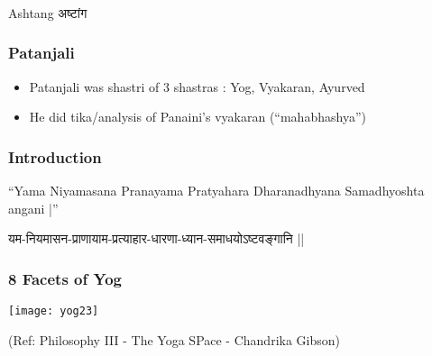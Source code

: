 \begin{frame}[fragile]\frametitle{}
\begin{center}
{\Large Ashtang अष्टांग }
\end{center}
\end{frame}

\begin{frame}[fragile]\frametitle{Patanjali}


	\begin{itemize}
	\item Patanjali was shastri of 3 shastras : Yog, Vyakaran, Ayurved
	\item He did tika/analysis of Panaini's vyakaran (``mahabhashya'')
	\end{itemize}


\end{frame}



\begin{frame}[fragile]\frametitle{Introduction}
``Yama Niyamasana Pranayama Pratyahara Dharanadhyana Samadhyoshta angani |''

यम-नियमासन-प्राणायाम-प्रत्याहार-धारणा-ध्यान-समाधयोऽष्टवङ्गानि ||

\end{frame}


\begin{frame}[fragile]\frametitle{8 Facets of Yog}

\begin{center}
\texttt{[image: yog23]}

\tiny{(Ref: Philosophy III - The Yoga SPace - Chandrika Gibson)}
\end{center}

\end{frame}